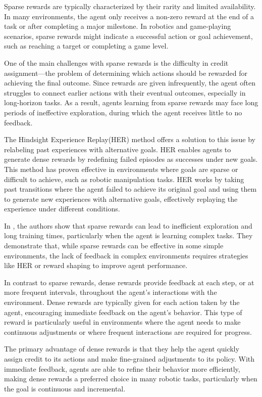 \documentclass[master,english,final]{kaist-ucs}
\begin{document}
Sparse rewards are typically characterized by their rarity and limited availability. In many environments, the agent only receives a non-zero reward at the end of a task or after completing a major milestone. In robotics and game-playing scenarios, sparse rewards might indicate a successful action or goal achievement, such as reaching a target or completing a game level.

One of the main challenges with sparse rewards is the difficulty in credit assignment—the problem of determining which actions should be rewarded for achieving the final outcome. Since rewards are given infrequently, the agent often struggles to connect earlier actions with their eventual outcomes, especially in long-horizon tasks. As a result, agents learning from sparse rewards may face long periods of ineffective exploration, during which the agent receives little to no feedback.

The Hindsight Experience Replay(HER) method\cite{andrychowicz2017hindsight} offers a solution to this issue by relabeling past experiences with alternative goals. HER\cite{andrychowicz2017hindsight} enables agents to generate dense rewards by redefining failed episodes as successes under new goals. This method has proven effective in environments where goals are sparse or difficult to achieve, such as robotic manipulation tasks. HER works by taking past transitions where the agent failed to achieve its original goal and using them to generate new experiences with alternative goals, effectively replaying the experience under different conditions.

In \cite{mohtasib2021study}, the authors show that sparse rewards can lead to inefficient exploration and long training times, particularly when the agent is learning complex tasks. They demonstrate that, while sparse rewards can be effective in some simple environments, the lack of feedback in complex environments requires strategies like HER or reward shaping to improve agent performance.

In contrast to sparse rewards, dense rewards provide feedback at each step, or at more frequent intervals, throughout the agent’s interactions with the environment. Dense rewards are typically given for each action taken by the agent, encouraging immediate feedback on the agent’s behavior. This type of reward is particularly useful in environments where the agent needs to make continuous adjustments or where frequent interactions are required for progress.

The primary advantage of dense rewards is that they help the agent quickly assign credit to its actions and make fine-grained adjustments to its policy. With immediate feedback, agents are able to refine their behavior more efficiently, making dense rewards a preferred choice in many robotic tasks, particularly when the goal is continuous and incremental.
\end{document}
